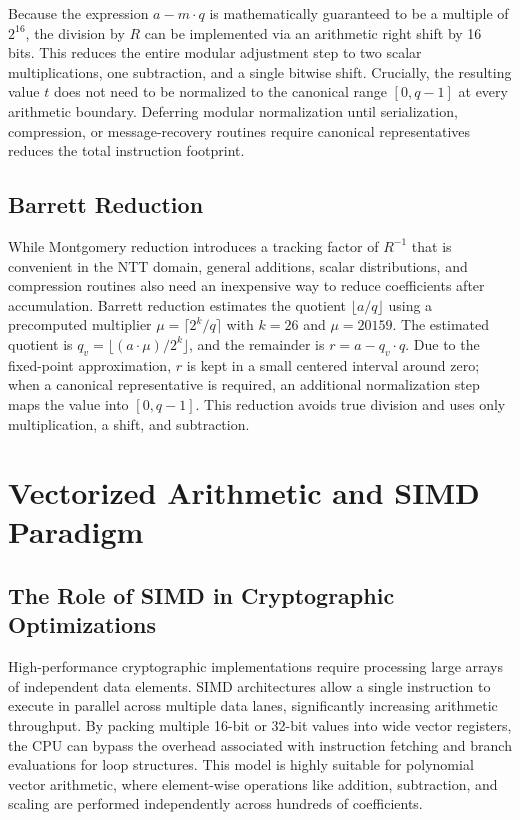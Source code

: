 Because the expression $a - m \cdot q$ is mathematically guaranteed to be a multiple of $2^{16}$, the division by $R$ can be implemented via an arithmetic right shift by 16 bits. This reduces the entire modular adjustment step to two scalar multiplications, one subtraction, and a single bitwise shift. Crucially, the resulting value $t$ does not need to be normalized to the canonical range $[0, q-1]$ at every arithmetic boundary. Deferring modular normalization until serialization, compression, or message-recovery routines require canonical representatives reduces the total instruction footprint.

\subsection{Barrett Reduction}
\label{sub:barrett_reduction}

While Montgomery reduction introduces a tracking factor of $R^{-1}$ that is convenient in the NTT domain, general additions, scalar distributions, and compression routines also need an inexpensive way to reduce coefficients after accumulation. Barrett reduction estimates the quotient $\lfloor a / q \rfloor$ using a precomputed multiplier $\mu = \lceil 2^k / q \rceil$ with $k = 26$ and $\mu = 20159$. The estimated quotient is $q_v = \lfloor (a \cdot \mu) / 2^k \rfloor$, and the remainder is $r = a - q_v \cdot q$. Due to the fixed-point approximation, $r$ is kept in a small centered interval around zero; when a canonical representative is required, an additional normalization step maps the value into $[0, q-1]$. This reduction avoids true division and uses only multiplication, a shift, and subtraction.

\section{Vectorized Arithmetic and SIMD Paradigm}
\label{sec:vectorized_arithmetic_simd}

\subsection{The Role of SIMD in Cryptographic Optimizations}
\label{sub:simd_role}

High-performance cryptographic implementations require processing large arrays of independent data elements. SIMD architectures allow a single instruction to execute in parallel across multiple data lanes, significantly increasing arithmetic throughput. By packing multiple 16-bit or 32-bit values into wide vector registers, the CPU can bypass the overhead associated with instruction fetching and branch evaluations for loop structures. This model is highly suitable for polynomial vector arithmetic, where element-wise operations like addition, subtraction, and scaling are performed independently across hundreds of coefficients.

